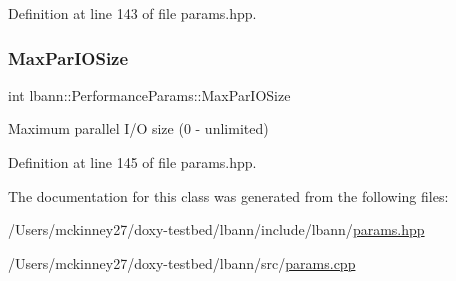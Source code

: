 Definition at line 143 of file params.\+hpp.

\mbox{\label{classlbann_1_1PerformanceParams_a6869434b1b4ff69d91f2998f9d194a8f}} 
\subsubsection{\texorpdfstring{Max\+Par\+I\+O\+Size}{MaxParIOSize}}
{\footnotesize\ttfamily int lbann\+::\+Performance\+Params\+::\+Max\+Par\+I\+O\+Size}



Maximum parallel I/O size (0 -\/ unlimited) 



Definition at line 145 of file params.\+hpp.



The documentation for this class was generated from the following files\+:\begin{DoxyCompactItemize}
\item 
/\+Users/mckinney27/doxy-\/testbed/lbann/include/lbann/\hyperlink{params_8hpp}{params.\+hpp}\item 
/\+Users/mckinney27/doxy-\/testbed/lbann/src/\hyperlink{params_8cpp}{params.\+cpp}\end{DoxyCompactItemize}
